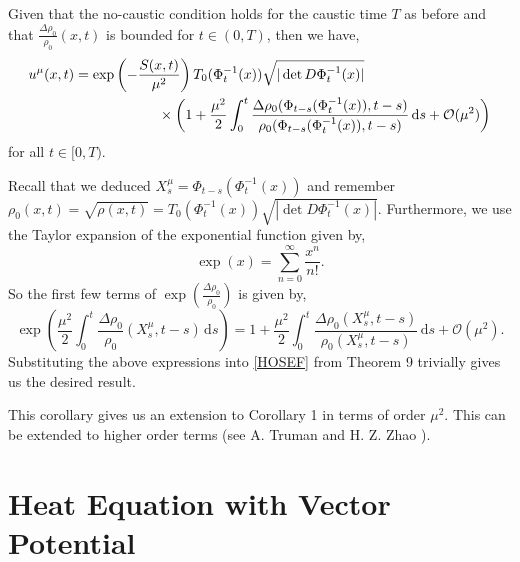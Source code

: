 \documentclass[a4paper,12pt,draft]{report}
\theoremstyle{remark}
\theoremstyle{definition}
\begin{document}
\cor
{
Given that the no-caustic condition holds for the caustic time $T$ as before and that $\frac{\Delta \rho_0}{\rho_0}(x, t)$ is bounded for $t \in (0, T)$, then we have,
\begin{align}
u^\mu(x, t) = \exp & \left(-\frac{S(x, t)}{\mu^2}\right)T_0(\Phi_t^{-1}(x))\sqrt{|\det D\Phi_t^{-1}(x)|}\nonumber\\
& \hspace{1.1cm} \times\left(1 + \frac{\mu^2}{2}\int_0^t\frac{\Delta \rho_0(\Phi_{t - s}(\Phi_t^{-1}(x)), t - s)}{\rho_0(\Phi_{t - s}(\Phi_t^{-1}(x)), t - s)}\,\mathrm{d}s + \mathcal{O}(\mu^2)\right)\nonumber
\end{align}
for all $t \in [0, T)$.
}
\proof
{
Recall that we deduced $X_s^\mu = \Phi_{t - s}(\Phi_t^{-1}(x))$ and remember $\rho_0(x, t) = \sqrt{\rho(x, t)} = T_0(\Phi_t^{-1}(x))\sqrt{|\det D\Phi_t^{-1}(x)|}$.  Furthermore, we use the Taylor expansion of the exponential function given by,
$$
\exp(x) = \sum_{n = 0}^\infty \frac{x^n}{n!}.
$$
So the first few terms of $\exp\left(\frac{\Delta\rho_0}{\rho_0}\right)$ is given by,
$$
\exp\left(\frac{\mu^2}{2}\int_0^t\frac{\Delta\rho_0}{\rho_0}(X_s^\mu, t - s)\,\mathrm{d}s\right) = 1 + \frac{\mu^2}{2}\int_0^t\frac{\Delta \rho_0(X_s^\mu, t - s)}{\rho_0(X_s^\mu, t - s)}\,\mathrm{d}s + \mathcal{O}(\mu^2).
$$
Substituting the above expressions into \eqref{HOSEF} from Theorem 9 trivially gives us the desired result.

\qedhere
}

This corollary gives us an extension to Corollary 1 in terms of order $\mu^2$.  This can be extended to higher order terms (see A. Truman and H. Z. Zhao \cite{ATHZZ}).








\chapter{Heat Equation with Vector Potential}
\end{document}
